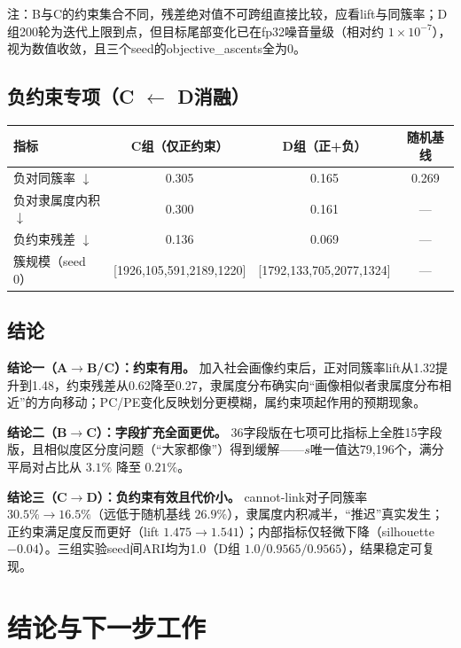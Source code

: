 \documentclass[11pt,a4paper]{ctexart}
\begin{document}
	注：B与C的约束集合不同，残差绝对值不可跨组直接比较，应看lift与同簇率；D组200轮为迭代上限到点，但目标尾部变化已在fp32噪音量级（相对约 $1\times10^{-7}$），视为数值收敛，且三个seed的objective\_ascents全为0。
	
	\subsection{负约束专项（C $\leftarrow$ D消融）}
	
	\begin{table}[H]
		\centering
		\small
		\begin{tabular}{lccc}
			\toprule
			指标 & C组（仅正约束） & D组（正+负） & 随机基线 \\
			\midrule
			负对同簇率 $\downarrow$ & 0.305 & 0.165 & 0.269 \\
			负对隶属度内积 $\downarrow$ & 0.300 & 0.161 & — \\
			负约束残差 $\downarrow$ & 0.136 & 0.069 & — \\
			簇规模（seed 0） & [1926,105,591,2189,1220] & [1792,133,705,2077,1324] & — \\
			\bottomrule
		\end{tabular}
	\end{table}
	
	\subsection{结论}
	
	\textbf{结论一（A$\rightarrow$B/C）：约束有用。} 加入社会画像约束后，正对同簇率lift从1.32提升到1.48，约束残差从0.62降至0.27，隶属度分布确实向“画像相似者隶属度分布相近”的方向移动；PC/PE变化反映划分更模糊，属约束项起作用的预期现象。
	
	\textbf{结论二（B$\rightarrow$C）：字段扩充全面更优。} 36字段版在七项可比指标上全胜15字段版，且相似度区分度问题（“大家都像”）得到缓解——$s$唯一值达79,196个，满分平局对占比从 $3.1\%$ 降至 $0.21\%$。
	
	\textbf{结论三（C$\rightarrow$D）：负约束有效且代价小。} cannot-link对子同簇率 $30.5\% \rightarrow 16.5\%$（远低于随机基线 $26.9\%$），隶属度内积减半，“推迟”真实发生；正约束满足度反而更好（lift $1.475\rightarrow 1.541$）；内部指标仅轻微下降（silhouette $-0.04$）。三组实验seed间ARI均为1.0（D组 $1.0/0.9565/0.9565$），结果稳定可复现。
	
	\section{结论与下一步工作}
	
\end{document}
